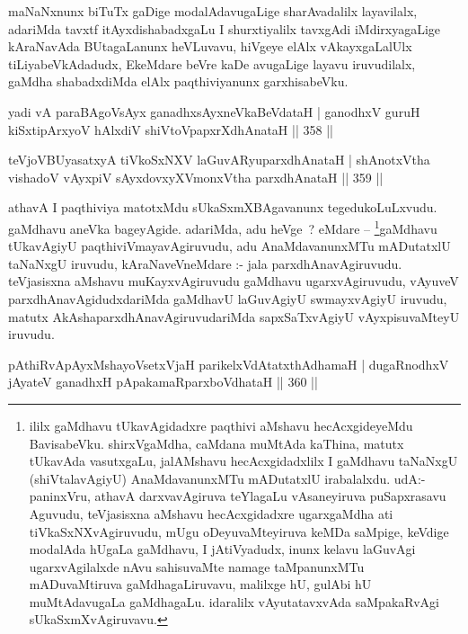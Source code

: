 \begin{artha}
maNaNxnunx biTuTx gaDige modalAdavugaLige sharAvadalilx layavilalx, adariMda tavxtf itAyxdishabadxgaLu I shurxtiyalilx tavxgAdi iMdirxyagaLige kAraNavAda BUtagaLanunx heVLuvavu, hiVgeye elAlx vAkayxgaLalUlx tiLiyabeVkAdadudx, EkeMdare beVre kaDe avugaLige layavu iruvudilalx, gaMdha shabadxdiMda elAlx paqthiviyanunx garxhisabeVku.
\end{artha}

\begin{shl}
yadi vA paraBAgoV\s sAyx ganadhxsAyxneVkaBeVdataH |
ganodhxV guruH kiSxtipArxyoV hAlxdiV shiVtoV\s papxrXdhAnataH \hfill || 358 ||
\end{shl}

\begin{shl}
teVjoVBUyasatxyA tiVkoSxNXV laGuvARyuparxdhAnataH |
shAnotxV\s tha vishadoV vAyxpiV sAyxdovxyXVmonxV\s tha parxdhAnataH \hfill || 359 ||
\end{shl}

\begin{artha}
athavA I paqthiviya matotxMdu sUkaSxmXBAgavanunx tegedukoLuLxvudu. gaMdhavu aneVka bageyAgide. adariMda, adu heVge~? eMdare -- \footnote{ililx gaMdhavu tUkavAgidadxre paqthivi aMshavu hecAcxgideyeMdu BavisabeVku. shirxVgaMdha, caMdana muMtAda kaThina, matutx tUkavAda vasutxgaLu, jalAMshavu hecAcxgidadxlilx I gaMdhavu taNaNxgU (shiVtalavAgiyU) AnaMdavanunxMTu mADutatxlU irabalalxdu. udA:- paninxVru, athavA darxvavAgiruva teYlagaLu vAsaneyiruva puSapxrasavu Aguvudu, teVjasisxna aMshavu hecAcxgidadxre ugarxgaMdha ati tiVkaSxNXvAgiruvudu, mUgu oDeyuvaMteyiruva keMDa saMpige, keVdige modalAda hUgaLa gaMdhavu, I jAtiVyadudx, inunx kelavu laGuvAgi ugarxvAgilalxde nAvu sahisuvaMte namage taMpanunxMTu mADuvaMtiruva gaMdhagaLiruvavu, malilxge hU, gulAbi hU muMtAdavugaLa gaMdhagaLu. idaralilx vAyutatavxvAda saMpakaRvAgi sUkaSxmXvAgiruvavu.}gaMdhavu tUkavAgiyU paqthiviVmayavAgiruvudu, adu AnaMdavanunxMTu mADutatxlU taNaNxgU iruvudu, kAraNaveVneMdare :- jala parxdhAnavAgiruvudu. teVjasisxna aMshavu muKayxvAgiruvudu gaMdhavu ugarxvAgiruvudu, vAyuveV parxdhAnavAgidudxdariMda gaMdhavU laGuvAgiyU swmayxvAgiyU iruvudu, matutx AkAshaparxdhAnavAgiruvudariMda sapxSaTxvAgiyU vAyxpisuvaMteyU iruvudu.
\end{artha}


\begin{shl}
pAthiRvApAyxMshayoVsetxVjaH parikelxVdAtatxthA\s dhamaH |
dugaRnodhxV jAyateV ganadhxH pApakamaRparxboVdhataH \hfill || 360 ||
\end{shl}

